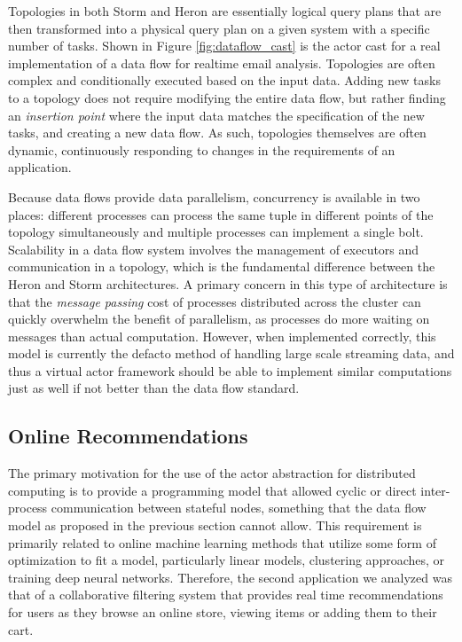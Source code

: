 \documentclass[draftclsnofoot,onecolumn,conference,11pt]{IEEEtran}
\begin{document}
Topologies in both Storm and Heron are essentially logical query plans that are then transformed into a physical query plan on a given system with a specific number of tasks. Shown in Figure \ref{fig:dataflow_cast} is the actor cast for a real implementation of a data flow for realtime email analysis. Topologies are often complex and conditionally executed based on the input data. Adding new tasks to a topology does not require modifying the entire data flow, but rather finding an \textit{insertion point} where the input data matches the specification of the new tasks, and creating a new data flow. As such, topologies themselves are often dynamic, continuously responding to changes in the requirements of an application.

Because data flows provide data parallelism, concurrency is available in two places: different processes can process the same tuple in different points of the topology simultaneously and multiple processes can implement a single bolt. Scalability in a data flow system involves the management of executors and communication in a topology, which is the fundamental difference between the Heron and Storm architectures. A primary concern in this type of architecture is that the \textit{message passing} cost of processes distributed across the cluster can quickly overwhelm the benefit of parallelism, as processes do more waiting on messages than actual computation. However, when implemented correctly, this model is currently the defacto method of handling large scale streaming data, and thus a virtual actor framework should be able to implement similar computations just as well if not better than the data flow standard.

\subsection{Online Recommendations}

The primary motivation for the use of the actor abstraction for distributed computing is to provide a programming model that allowed cyclic or direct inter-process communication between stateful nodes, something that the data flow model as proposed in the previous section cannot allow. This requirement is primarily related to online machine learning methods that utilize some form of optimization to fit a model, particularly linear models, clustering approaches, or training deep neural networks. Therefore, the second application we analyzed was that of a collaborative filtering system that provides real time recommendations for users as they browse an online store, viewing items or adding them to their cart.
\end{document}
